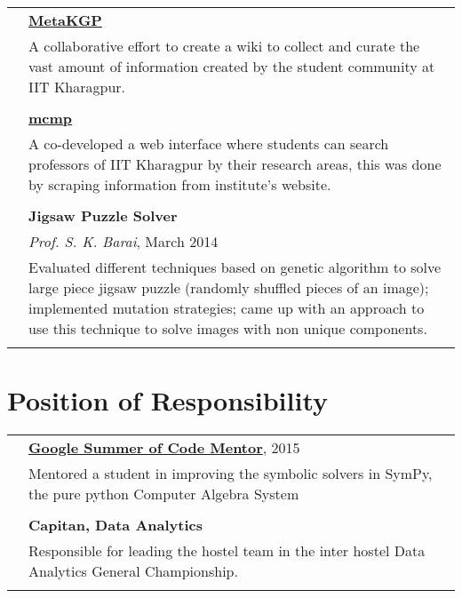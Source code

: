 \documentclass[a4paper,10pt]{article}
\begin{document}
\begin{tabular}{rp{12cm}}
    \textsc{} & \textbf{\href{https://wiki.metakgp.org}{MetaKGP}} \\&
       A collaborative effort to create a wiki to collect and curate the vast
       amount of information created by the student community at IIT Kharagpur.
\\\multicolumn{2}{c}{} \\

    \textsc{} & \textbf{\href{https://github.com/metakgp/mcmp}{mcmp}} \\&
        A co-developed a web interface where students can search professors of
        IIT Kharagpur by their research areas, this was done by scraping
        information from institute's website.
\\\multicolumn{2}{c}{} \\

\textsc{} & \textbf{Jigsaw Puzzle Solver} \\
\textsc{} & \emph{Prof. S. K. Barai}, March 2014 \\&
    Evaluated different techniques based on genetic algorithm to solve large
    piece jigsaw puzzle (randomly shuffled pieces of an image); implemented
    mutation strategies; came up with an approach to use this technique to solve
    images with non unique components.
\\\multicolumn{2}{c}{} \\

\end{tabular}

\section{Position of Responsibility}
\begin{tabular}{rp{12cm}}
\textsc{} &
\textbf{\href{https://github.com/sympy/sympy/wiki/GSoC-2015-Report-Amit-Kumar-:-Solvers}{Google
Summer of Code Mentor}}, 2015
    \\&Mentored a student in improving the symbolic
    solvers in SymPy, the pure python Computer Algebra System\\\multicolumn{2}{c}{} \\

    \textsc{} & \textbf{Capitan, Data Analytics}
    \\&
    Responsible for leading the hostel team in the inter hostel
    Data Analytics General Championship.
\\\multicolumn{2}{c}{} \\

\end{tabular}
\end{document}
